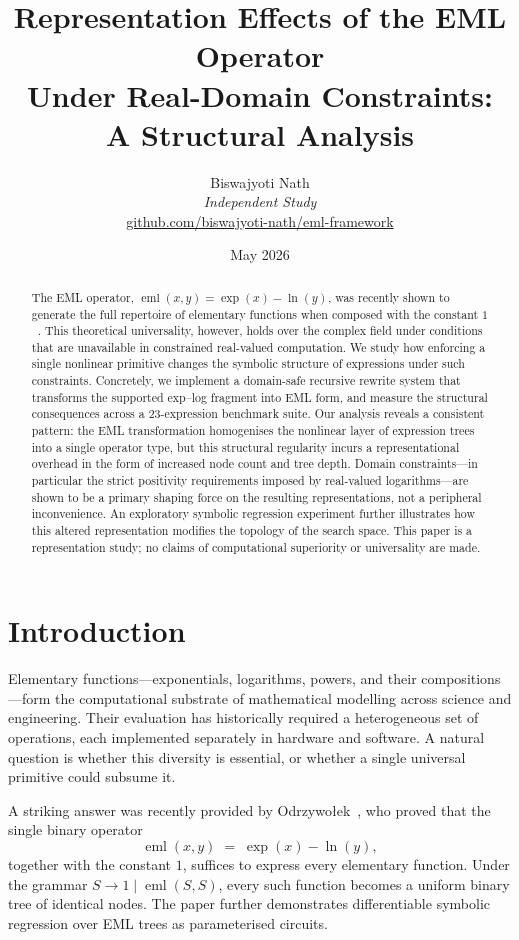 \documentclass[11pt,a4paper]{article}
\title{%
  Representation Effects of the EML Operator\\
  Under Real-Domain Constraints:\\
  A Structural Analysis
}
\author{%
  Biswajyoti Nath\\
  \small\textit{Independent Study}\\
  \small\href{https://github.com/biswajyoti-nath/eml-framework}%
             {github.com/biswajyoti-nath/eml-framework}
}
\date{May 2026}
\newcommand{\eml}{\operatorname{eml}}
\newcommand{\expf}{\operatorname{exp}}
\newcommand{\lnf}{\operatorname{ln}}
\begin{document}
\maketitle

\begin{abstract}
The EML operator, $\eml(x,y) = \expf(x) - \lnf(y)$, was recently shown to
generate the full repertoire of elementary functions when composed with the
constant $1$~\cite{odrzywolek2026eml}. This theoretical universality, however,
holds over the complex field under conditions that are unavailable in constrained
real-valued computation. We study how enforcing a single nonlinear primitive
changes the symbolic structure of expressions under such constraints.
Concretely, we implement a domain-safe recursive rewrite system that transforms
the supported exp--log fragment into EML form, and measure the structural
consequences across a 23-expression benchmark suite. Our analysis reveals a
consistent pattern: the EML transformation homogenises the nonlinear layer of
expression trees into a single operator type, but this structural regularity
incurs a representational overhead in the form of increased node count and tree
depth. Domain constraints---in particular the strict positivity requirements
imposed by real-valued logarithms---are shown to be a primary shaping force on
the resulting representations, not a peripheral inconvenience. An exploratory
symbolic regression experiment further illustrates how this altered representation
modifies the topology of the search space. This paper is a representation
study; no claims of computational superiority or universality are made.
\end{abstract}

\section{Introduction}

Elementary functions---exponentials, logarithms, powers, and their
compositions---form the computational substrate of mathematical modelling
across science and engineering. Their evaluation has historically required
a heterogeneous set of operations, each implemented separately in hardware
and software. A natural question is whether this diversity is essential,
or whether a single universal primitive could subsume it.

A striking answer was recently provided by Odrzywołek~\cite{odrzywolek2026eml},
who proved that the single binary operator
\begin{equation}
  \eml(x, y) \;=\; \expf(x) - \lnf(y),
  \label{eq:eml}
\end{equation}
together with the constant $1$, suffices to express every elementary function.
Under the grammar $S \to 1 \mid \eml(S, S)$, every such function becomes
a uniform binary tree of identical nodes. The paper further demonstrates
differentiable symbolic regression over EML trees as parameterised circuits.
\end{document}
